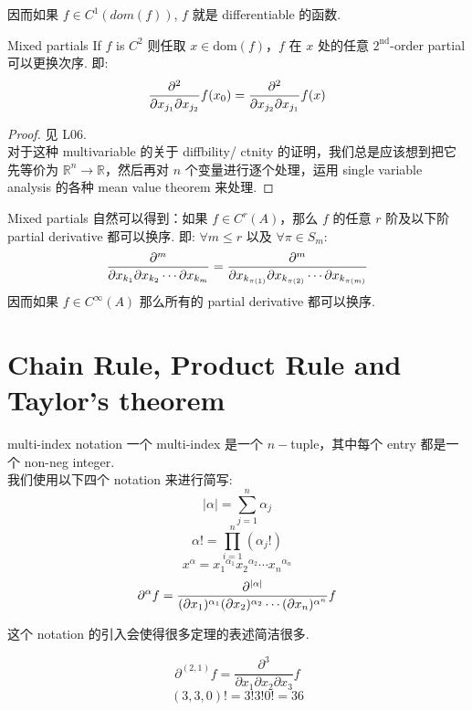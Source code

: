 \begin{remark}
    因而如果 $f \in C^1(dom(f))$, $f$ 就是 differentiable 的函数.
\end{remark}


\begin{theorem}{Mixed partials}
    If $f$ is $C^2$ 则任取 $x \in \text{dom}(f)$，$f$ 在 $x$ 处的任意 $2^\text{nd}$-order partial 可以更换次序. 即:
    $$
    {\partial^2 \over \partial x_{j_1} \partial x_{j_2}}f(x_0) = {\partial^2 \over \partial x_{j_2} \partial x_{j_1}} f(x)
    $$
\end{theorem}
\begin{proof}
    见 L06.\\
    对于这种 multivariable 的关于 diffbility/ ctnity 的证明，我们总是应该想到把它先等价为 $\mathbb{R}^n \rightarrow \mathbb{R}$，然后再对 $n$ 个变量进行逐个处理，运用 single variable analysis 的各种 mean value theorem 来处理.
\end{proof}


\begin{corollary}{Mixed partials}\label{Mixed partials}
    自然可以得到：如果 $f \in C^r(A)$，那么 $f$ 的任意 $r$ 阶及以下阶 partial derivative 都可以换序. 即: $\forall m \leq r$ 以及 $\forall \pi \in S_m$:
    $$
     {\partial^m \over \partial x_{k_1}\partial x_{k_{2}}\cdots \partial x_{k_m}} = {\partial^m \over \partial x_{k_{\pi(1)}}\partial x_{k_{\pi(2)}}\cdots \partial x_{k_{\pi(m)}}}
    $$
    因而如果 $f\in C^\infty (A)$ 那么所有的 partial derivative 都可以换序.
\end{corollary}


\section{Chain Rule, Product Rule and Taylor's theorem}
\begin{definition}{multi-index notation} \label{multi-index}
一个 multi-index 是一个 $n-$tuple，其中每个 entry 都是一个 non-neg integer.\\
我们使用以下四个 notation 来进行简写:\\
$$
|\alpha| = \sum_{j = 1}^n \alpha_j
$$
$$
\alpha! = \prod_{i = 1}^n (\alpha_j !)
$$
$$
x^{\alpha} = {x_1}^{\alpha_1}{x_2}^{\alpha_2} \cdots {x_n}^{\alpha_n}
$$
$$
\partial ^ \alpha f ={\partial^{|\alpha|} \over (\partial {x_1})^{\alpha_1} (\partial {x_2})^{\alpha_2} \cdots (\partial {x_n})^{\alpha^n}} f  
$$
\end{definition}
这个 notation 的引入会使得很多定理的表述简洁很多.
\begin{example}
$$
\partial ^{(2,1)} f = \frac{\partial^3}{\partial x_1 \partial x_2 \partial x_3 } f
$$
$$
(3,3,0)! = 3!3!0! = 36
$$
\end{example}


